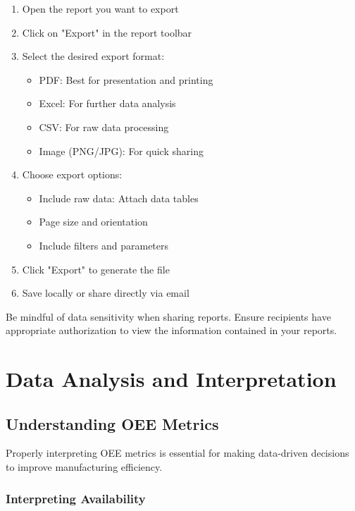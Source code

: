 \documentclass[12pt,a4paper]{report}
\newenvironment{warning}
  {\begin{tcolorbox}[colback=tuliplightgray,colframe=tulipred,title=Warning]}
  {\end{tcolorbox}}
\begin{document}
\begin{enumerate}
    \item Open the report you want to export
    \item Click on "Export" in the report toolbar
    \item Select the desired export format:
    \begin{itemize}
        \item PDF: Best for presentation and printing
        \item Excel: For further data analysis
        \item CSV: For raw data processing
        \item Image (PNG/JPG): For quick sharing
    \end{itemize}
    \item Choose export options:
    \begin{itemize}
        \item Include raw data: Attach data tables
        \item Page size and orientation
        \item Include filters and parameters
    \end{itemize}
    \item Click "Export" to generate the file
    \item Save locally or share directly via email
\end{enumerate}

\begin{warning}
Be mindful of data sensitivity when sharing reports. Ensure recipients have appropriate authorization to view the information contained in your reports.
\end{warning}

\chapter{Data Analysis and Interpretation}

\section{Understanding OEE Metrics}

Properly interpreting OEE metrics is essential for making data-driven decisions to improve manufacturing efficiency.

\subsection{Interpreting Availability}
\end{document}

